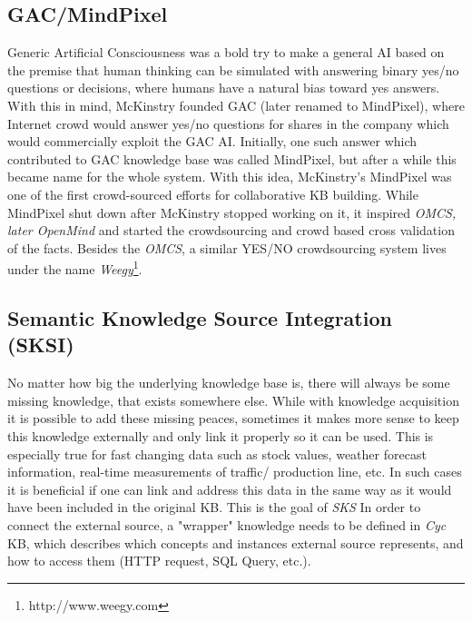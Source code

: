 \subsection{GAC/MindPixel}
\label{section:r:gac}
Generic Artificial Consciousness was a bold try to make a general AI based on
the premise that human thinking can be simulated with answering binary yes/no
questions or decisions\parencite{McKinstry2008}, where humans have a natural 
bias toward yes answers. With this in mind, McKinstry founded GAC (later renamed
to MindPixel), where Internet crowd would answer yes/no questions for shares
in the company which would commercially exploit the GAC AI. Initially, one such
answer which contributed to GAC knowledge base was called MindPixel, but after
a while this became name for the whole system. With this idea, McKinstry's
MindPixel was one of the first crowd-sourced efforts for collaborative KB
building. While MindPixel shut down after McKinstry stopped working on it,
it inspired \emph{OMCS, later OpenMind} and started the crowdsourcing and
crowd based cross validation of the facts. Besides the \emph{OMCS}, a similar
YES/NO crowdsourcing system lives under the name 
\emph{Weegy}\footnote{http://www.weegy.com}.

\subsection{Semantic Knowledge Source Integration (SKSI)}
\label{section:r:sksi}
No matter how big the underlying knowledge base is, there will always be some
missing knowledge, that exists somewhere else. While with knowledge acquisition
it is possible to add these missing peaces, sometimes it makes more sense to
keep this knowledge externally and only link it properly so it can be used.
This is especially true for fast changing data such as stock values, weather
forecast information, real-time measurements of traffic/ production line, etc.
In such cases it is beneficial if one can link and address this data in the 
same way as it would have been included in the original KB. This is the goal
of \emph{SKS}\parencite{Masters2007}
In order to connect the external source, a "wrapper" knowledge needs to be
defined in \emph{Cyc} KB, which describes which concepts and instances external
source represents, and how to access them (HTTP request, SQL Query, etc.).

